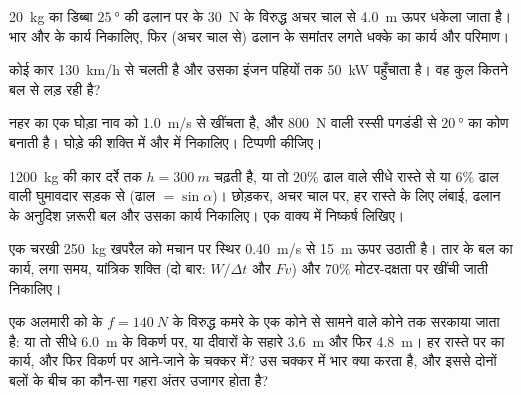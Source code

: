 \begin{exercise}[$\star\star$]\label{exo:g11:work-of-force:9}
\qty{20}{kg} का डिब्बा $\qty{25}{\degree}$ की ढलान पर  के \qty{30}{N} के विरुद्ध
अचर चाल से \qty{4.0}{m} ऊपर धकेला जाता है। भार और  के
कार्य निकालिए, फिर (अचर चाल से) ढलान के समांतर लगते धक्के का
कार्य और परिमाण।
\end{exercise}

\begin{exercise}[$\star\star$]\label{exo:g11:work-of-force:10}
कोई कार \qty{130}{km/h} से चलती है और उसका इंजन पहियों तक \qty{50}{kW} पहुँचाता है। वह
कुल कितने  बल से लड़ रही है?
\end{exercise}

\begin{exercise}[$\star\star$]\label{exo:g11:work-of-force:11}
नहर का एक घोड़ा नाव को \qty{1.0}{m/s} से खींचता है, और \qty{800}{N}  वाली
रस्सी पगडंडी से $\qty{20}{\degree}$ का कोण बनाती है। घोड़े की शक्ति
 में और  में निकालिए। टिप्पणी कीजिए।
\end{exercise}

\begin{exercise}[$\star\star\star$]\label{exo:g11:work-of-force:12}
\qty{1200}{kg} की कार दर्रे तक $h = \qty{300}{m}$ चढ़ती है, या तो $20\%$ ढाल वाले सीधे रास्ते
से या $6\%$ ढाल वाली घुमावदार सड़क से (ढाल $=
\sin\alpha$)।  छोड़कर,
अचर चाल पर, हर रास्ते के लिए लंबाई, ढलान के अनुदिश ज़रूरी बल और
उसका कार्य निकालिए। एक वाक्य में निष्कर्ष लिखिए।
\end{exercise}

\begin{exercise}[$\star\star\star$]\label{exo:g11:work-of-force:13}
एक चरखी \qty{250}{kg} खपरैल को मचान पर स्थिर \qty{0.40}{m/s} से \qty{15}{m} ऊपर उठाती है। तार
के बल का कार्य, लगा समय, यांत्रिक शक्ति (दो बार:
$W/\Delta t$ और $Fv$) और $70\%$ मोटर-दक्षता पर खींची जाती
 निकालिए।
\end{exercise}

\begin{exercise}[$\star\star\star$]\label{exo:g11:work-of-force:14}
एक अलमारी को  के $f = \qty{140}{N}$ के विरुद्ध कमरे के एक कोने से सामने
वाले कोने तक सरकाया जाता है: या तो सीधे \qty{6.0}{m} के विकर्ण पर, या दीवारों के
सहारे \qty{3.6}{m} और फिर \qty{4.8}{m}। हर रास्ते पर  का कार्य,
और फिर विकर्ण पर आने-जाने के चक्कर में? उस चक्कर में भार क्या करता
है, और इससे दोनों बलों के बीच का कौन-सा गहरा अंतर उजागर होता है?
\end{exercise}

